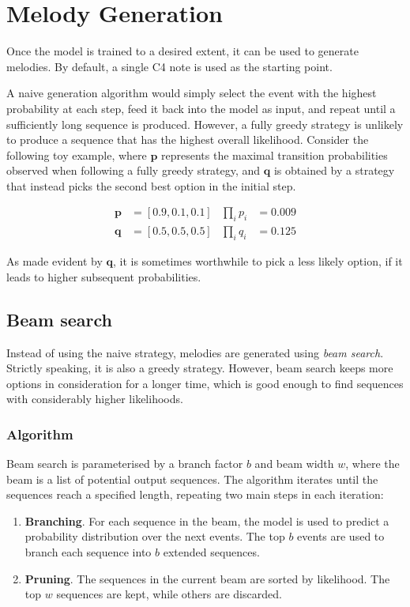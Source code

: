 \documentclass[../../report.tex]{subfiles}
\begin{document}
\section{Melody Generation}

Once the model is trained to a desired extent, it can be used to generate
melodies. By default, a single C4 note is used as the starting point.

A naive generation algorithm would simply select the event with the highest
probability at each step, feed it back into the model as input, and repeat until
a sufficiently long sequence is produced. However, a fully greedy strategy is
unlikely to produce a sequence that has the highest overall likelihood. Consider
the following toy example, where \(\bm{p}\) represents the maximal transition
probabilities observed when following a fully greedy strategy, and \(\bm{q}\) is
obtained by a strategy that instead picks the second best option in the initial
step.

\begin{align}
  \bm{p} &= [0.9, 0.1, 0.1] & \prod_{i} p_i &= 0.009
  \\
  \bm{q} &= [0.5, 0.5, 0.5] & \prod_{i} q_i &= 0.125
\end{align}

As made evident by \(\bm{q}\), it is sometimes worthwhile to pick a less likely
option, if it leads to higher subsequent probabilities.

\subsection{Beam search}

Instead of using the naive strategy, melodies are generated using \emph{beam
search}. Strictly speaking, it is also a greedy strategy. However, beam search
keeps more options in consideration for a longer time, which is good enough to
find sequences with considerably higher likelihoods.

\subsubsection{Algorithm}

Beam search is parameterised by a branch factor \(b\) and beam width \(w\),
where the beam is a list of potential output sequences. The algorithm iterates
until the sequences reach a specified length, repeating two main steps in each
iteration:

\begin{enumerate}
  \item \textbf{Branching}. For each sequence in the beam, the model is used to
  predict a probability distribution over the next events. The top \(b\) events
  are used to branch each sequence into \(b\) extended sequences.

  \item \textbf{Pruning}. The sequences in the current beam are sorted by
  likelihood. The top \(w\) sequences are kept, while others are discarded.
\end{enumerate}
\end{document}
